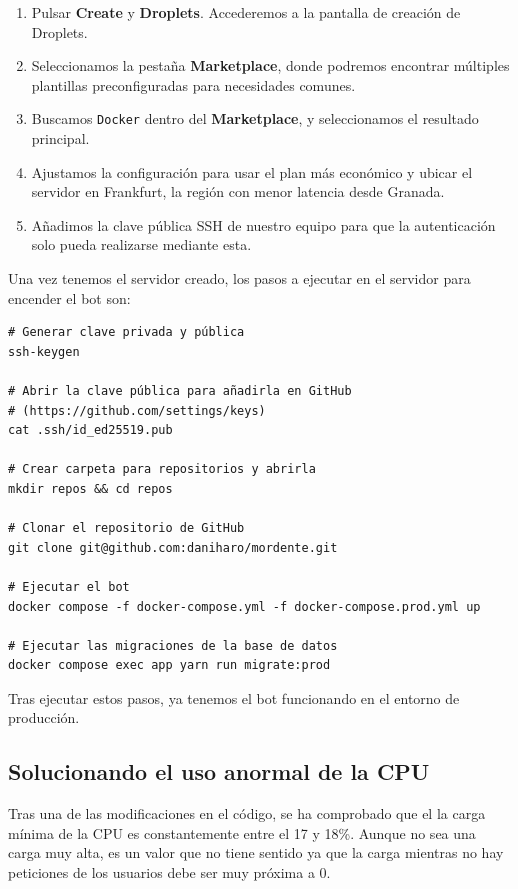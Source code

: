 \begin{enumerate}
    \item Pulsar \textbf{Create} y \textbf{Droplets}. Accederemos a la pantalla de creación de Droplets.
    \item Seleccionamos la pestaña \textbf{Marketplace}, donde podremos encontrar múltiples plantillas preconfiguradas para necesidades comunes.
    \item Buscamos \texttt{Docker} dentro del \textbf{Marketplace}, y seleccionamos el resultado principal.
    \item Ajustamos la configuración para usar el plan más económico y ubicar el servidor en Frankfurt, la región con menor latencia desde Granada.
    \item Añadimos la clave pública SSH de nuestro equipo para que la autenticación solo pueda realizarse mediante esta.
\end{enumerate}

Una vez tenemos el servidor creado, los pasos a ejecutar en el servidor para encender el bot son:

\begin{verbatim}
# Generar clave privada y pública
ssh-keygen

# Abrir la clave pública para añadirla en GitHub
# (https://github.com/settings/keys)
cat .ssh/id_ed25519.pub

# Crear carpeta para repositorios y abrirla
mkdir repos && cd repos

# Clonar el repositorio de GitHub
git clone git@github.com:daniharo/mordente.git

# Ejecutar el bot
docker compose -f docker-compose.yml -f docker-compose.prod.yml up

# Ejecutar las migraciones de la base de datos
docker compose exec app yarn run migrate:prod
\end{verbatim}

Tras ejecutar estos pasos, ya tenemos el bot funcionando en el entorno de producción.

\subsection{Solucionando el uso anormal de la CPU}

Tras una de las modificaciones en el código, se ha comprobado que el la carga mínima de la CPU es constantemente entre el 17 y 18\%. Aunque no sea una carga muy alta, es un valor que no tiene sentido ya que la carga mientras no hay peticiones de los usuarios debe ser muy próxima a 0.


